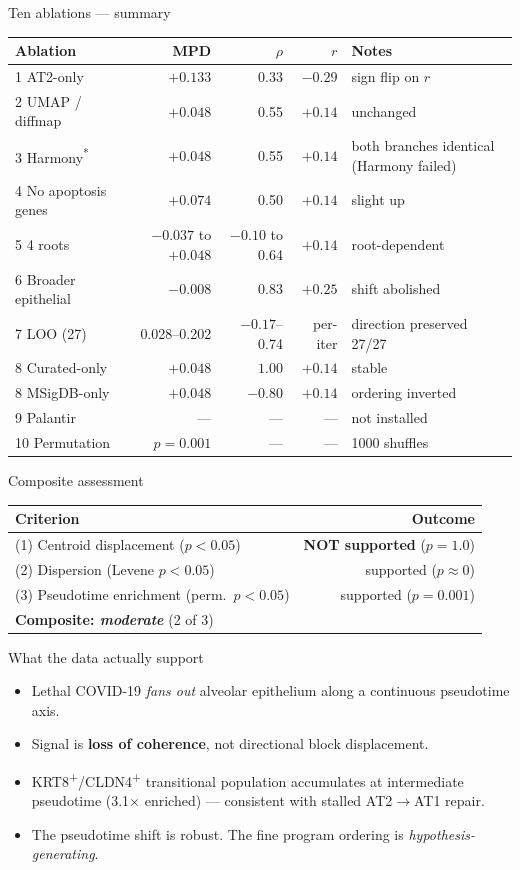 \documentclass[aspectratio=169]{beamer}
\begin{document}
\begin{frame}{Ten ablations --- summary}
\scriptsize
\begin{tabular}{lrrr l}
\toprule
Ablation & MPD & $\rho$ & $r$ & Notes \\
\midrule
1 AT2-only & $+0.133$ & 0.33 & $-0.29$ & sign flip on $r$ \\
2 UMAP / diffmap & $+0.048$ & 0.55 & $+0.14$ & unchanged \\
3 Harmony\textsuperscript{*} & $+0.048$ & 0.55 & $+0.14$ & \alert{both branches identical (Harmony failed)} \\
4 No apoptosis genes & $+0.074$ & 0.50 & $+0.14$ & slight up \\
5 4 roots & $-0.037$ to $+0.048$ & $-0.10$ to 0.64 & $+0.14$ & root-dependent \\
6 Broader epithelial & $-0.008$ & 0.83 & $+0.25$ & \alert{shift abolished} \\
7 LOO (27) & 0.028--0.202 & $-0.17$--0.74 & per-iter & direction preserved 27/27 \\
8 Curated-only & $+0.048$ & $1.00$ & $+0.14$ & stable \\
8 MSigDB-only & $+0.048$ & $-0.80$ & $+0.14$ & \alert{ordering inverted} \\
9 Palantir & --- & --- & --- & not installed \\
10 Permutation & $p=0.001$ & --- & --- & 1000 shuffles \\
\bottomrule
\end{tabular}
\end{frame}

\begin{frame}{Composite assessment}
\begin{tabular}{lr}
\toprule
Criterion & Outcome \\
\midrule
(1) Centroid displacement ($p < 0.05$) & \alert{\textbf{NOT supported}} ($p = 1.0$) \\
(2) Dispersion (Levene $p < 0.05$) & supported ($p \approx 0$) \\
(3) Pseudotime enrichment (perm.\ $p < 0.05$) & supported ($p = 0.001$) \\
\midrule
\textbf{Composite: \emph{moderate}} (2 of 3) & \\
\bottomrule
\end{tabular}
\end{frame}

\begin{frame}{What the data actually support}
\begin{itemize}
  \item Lethal COVID-19 \emph{fans out} alveolar epithelium along a continuous pseudotime axis.
  \item Signal is \textbf{loss of coherence}, not directional block displacement.
  \item KRT8\textsuperscript{+}/CLDN4\textsuperscript{+} transitional population accumulates at intermediate pseudotime (3.1$\times$ enriched) --- consistent with stalled AT2$\rightarrow$AT1 repair.
  \item The pseudotime shift is robust. The fine program ordering is \emph{hypothesis-generating}.
\end{itemize}
\end{frame}
\end{document}
